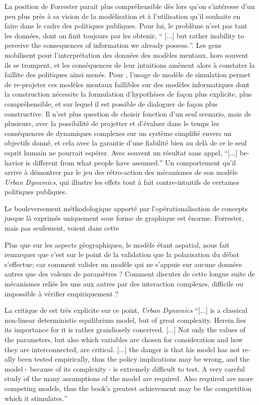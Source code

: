La position de Forrester parait plus compréhensible dès lors qu'on s'intéresse d'un peu plus près à sa vision de la modélisation et à l'utilisation qu'il souhaite en faire dans le cadre des politiques publiques. Pour lui, le problème n'est pas tant les données, dont on finit toujours par les obtenir, \foreignquote{english}{ [...] but rather inability to perceive the consequences of information we already possess.}. Les gens mobilisent pour l'interprétation des données des modèles mentaux, hors souvent ils se trompent, et les conséquences de leur intuitions amènent alors à constater la faillite des politiques ainsi menés. Pour \textcite{Forrester1971}, l'usage de modèle de simulation permet de re-projeter ces modèles mentaux faillibles sur des modèles informatiques dont la construction nécessite la formulation d'hypothèses de façon plus explicite, plus compréhensible, et sur lequel il est possible de dialoguer de façon plus constructive. Il n'est plus question de choisir fonction d'un seul scenario, mais de plusieurs, avec la possibilité de projetter et d'évaluer dans le temps les conséquences de dynamiques complexes sur un système simplifié envers un objectifs donné, et cela avec la garantie d'une fiabilité bien au delà de ce le seul esprit humain ne pourrait espérer. Avec souvent un résultat sans appel, \foreignquote{english}{[...] behavior is different from what people have assumed.} Un comportement qu'il arrive à démontrer par le jeu des rétro-action des mécanismes de son modèle \textit{Urban Dynamics}, qui illustre les effets tout à fait contre-intuitifs de certaines politiques publiques.

Le bouleversement méthodologique apporté par l'opérationalisation de concepts jusque là exprimés uniquement sous forme de graphique est énorme. Forrester, mais pas seulement, voient dans cette 

Plus que sur les aspects géographiques, le modèle étant aspatial, \autocite{Batty2001} nous fait remarquer que c'est sur le point de la validation que la polarisation du débat s'effectue; car comment valider un modèle qui ne s'appuie sur aucune données autres que des valeurs de paramètres ? Comment discuter de cette longue suite de mécanismes reliés les uns aux autres par des interaction complexes, difficile ou impossible à vérifier empiriquement ?

La critique de \textcite{Tobler1970a} est très explicite sur ce point, \textit{Urban Dynamics} \foreignquote{english}{[...] is a classical non-linear deterministic equilibrium model, but of great complexity. Herein lies its importance for it is rather grandiosely conceived. [...] Not only the values of the parameters, but also which variables are chosen for consideration and how they are interconnected, are critical. [...] the danger is that his model has not really been tested empirically, thus the policy implications may be wrong, and the model - because of its complexity - is extremely difficult to test. A very careful study of the many assumptions of the model are required. Also required are more competing models, thus the book’s greatest achievement may be the competition which it stimulates.} 

